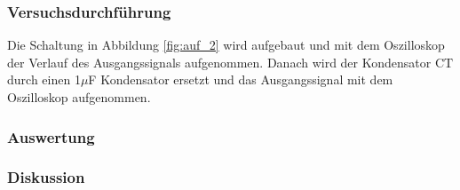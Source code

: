 \documentclass[12pt,a4paper]{article}
\begin{document}
\subsubsection*{Versuchsdurchführung}

Die Schaltung in Abbildung \ref{fig:auf_2} wird aufgebaut und mit dem Oszilloskop der Verlauf des Ausgangssignals aufgenommen. Danach wird der Kondensator C$\text{T}$ durch einen 1$\mu$F Kondensator ersetzt und das Ausgangssignal mit dem Oszilloskop aufgenommen. 

\subsubsection*{Auswertung}
\subsubsection*{Diskussion}
\end{document}
